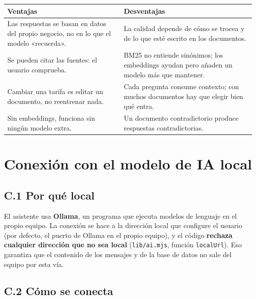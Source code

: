 {\def\LTcaptype{none} %
\begin{longtable}[]{@{}
  >{\raggedright\arraybackslash}p{}
  >{\raggedright\arraybackslash}p{}@{}}
\toprule\noalign{}
\begin{minipage}[b]{\linewidth}\raggedright
Ventajas
\end{minipage} & \begin{minipage}[b]{\linewidth}\raggedright
Desventajas
\end{minipage} \\
\midrule\noalign{}
\endhead
\bottomrule\noalign{}
\endlastfoot
Las respuestas se basan en datos del propio negocio, no en lo que el modelo «recuerda». & La calidad depende de cómo se trocea y de lo que esté escrito en los documentos. \\
Se pueden citar las fuentes: el usuario comprueba. & BM25 no entiende sinónimos; los embeddings ayudan pero añaden un modelo más que mantener. \\
Cambiar una tarifa es editar un documento, no reentrenar nada. & Cada pregunta consume contexto; con muchos documentos hay que elegir bien qué entra. \\
Sin embeddings, funciona sin ningún modelo extra. & Un documento contradictorio produce respuestas contradictorias. \\
\end{longtable}
}

\chapter{Conexión con el modelo de IA local}\label{conexiuxf3n-con-el-modelo-de-ia-local}

\section{C.1 Por qué local}\label{c.1-por-quuxe9-local}

El asistente usa \textbf{Ollama}, un programa que ejecuta modelos de lenguaje en el propio equipo. La conexión se hace a la dirección local que configure el usuario (por defecto, el puerto de Ollama en el propio equipo), y el código \textbf{rechaza cualquier dirección que no sea local} (\texttt{lib/ai.mjs}, función \texttt{localUrl}). Eso garantiza que el contenido de los mensajes y de la base de datos no sale del equipo por esta vía.

\section{C.2 Cómo se conecta}\label{c.2-cuxf3mo-se-conecta}

